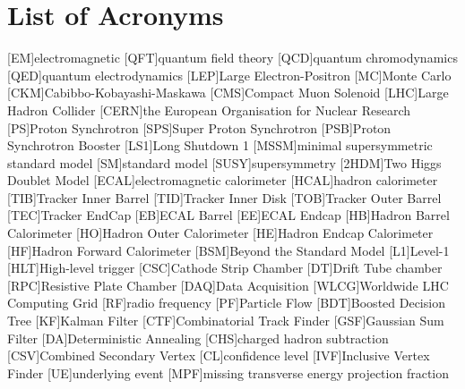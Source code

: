




\chapter*{List of Acronyms}
\begin{acronym}[CERN]
[EM]{electromagnetic}
[QFT]{quantum field theory}
[QCD]{quantum chromodynamics}
[QED]{quantum electrodynamics}
[LEP]{Large Electron-Positron}
[MC]{Monte Carlo}
[CKM]{Cabibbo-Kobayashi-Maskawa}
[CMS]{Compact Muon Solenoid}
[LHC]{Large Hadron Collider}
[CERN]{the European Organisation for Nuclear Research }
[PS]{Proton Synchrotron}
[SPS]{Super Proton Synchrotron}
[PSB]{Proton Synchrotron Booster}
[LS1]{Long Shutdown 1}
[MSSM]{minimal supersymmetric standard model}
[SM]{standard model}
[SUSY]{supersymmetry}
[2HDM]{Two Higgs Doublet Model}
[ECAL]{electromagnetic calorimeter}
[HCAL]{hadron calorimeter}
[TIB]{Tracker Inner Barrel}
[TID]{Tracker Inner Disk}
[TOB]{Tracker Outer Barrel}
[TEC]{Tracker EndCap}
[EB]{ECAL Barrel}
[EE]{ECAL Endcap}
[HB]{Hadron Barrel Calorimeter}
[HO]{Hadron Outer Calorimeter}
[HE]{Hadron Endcap Calorimeter}
[HF]{Hadron Forward Calorimeter}
[BSM]{Beyond the Standard Model}
[L1]{Level-1}
[HLT]{High-level trigger}
[CSC]{Cathode Strip Chamber}
[DT]{Drift Tube chamber}
[RPC]{Resistive Plate Chamber}
[DAQ]{Data Acquisition}
[WLCG]{Worldwide LHC Computing Grid}
[RF]{radio frequency}
[PF]{Particle Flow}
[BDT]{Boosted Decision Tree}
[KF]{Kalman Filter}
[CTF]{Combinatorial Track Finder}
[GSF]{Gaussian Sum Filter}
[DA]{Deterministic Annealing}
[CHS]{charged hadron subtraction}
[CSV]{Combined Secondary Vertex}
[CL]{confidence level}
[IVF]{Inclusive Vertex Finder}
[UE]{underlying event}
[MPF]{missing transverse energy projection fraction}
\end{acronym}

